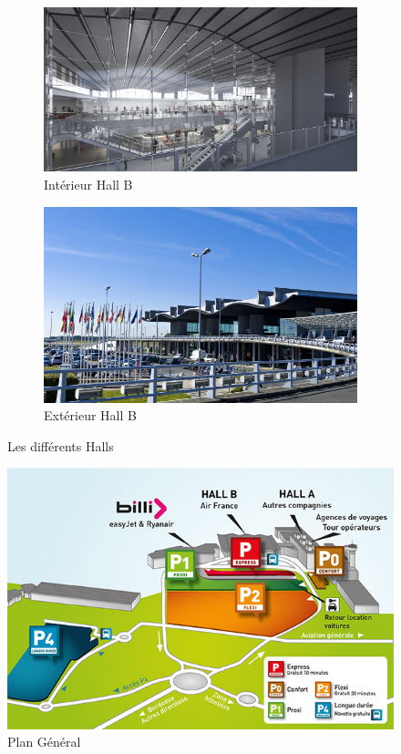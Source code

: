 \begin{figure}[hbt!]
    \begin{subfigure}{.5\textwidth}
      \centering
      \includegraphics[width=.7\linewidth]{Images/inthallb.jpg}  
      \caption{Intérieur Hall B}
      \label{fig:inthallb}
    \end{subfigure}
    \begin{subfigure}{.5\textwidth}
      \centering
      \includegraphics[width=.7\linewidth]{Images/exthallb.jpg}  
      \caption{Extérieur Hall B}
      \label{fig:exthallb}
    \end{subfigure}
    \caption{Les différents Halls}
    \label{fig:halls}
\end{figure}

\begin{figure}[hbt!]
    \centering
    \includegraphics[width=.7\linewidth]{Images/plan.jpg}
    \caption{Plan Général}
    \label{fig:plangeneral}
\end{figure}

